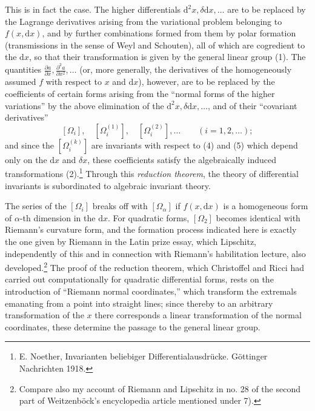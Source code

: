 \documentclass[11pt]{article}
\providecommand{\dd}{\mathrm d}
\begin{document}
This is in fact the case. The higher differentials $\dd^2x,\delta\dd x,\ldots$ are to be replaced by the Lagrange derivatives arising from the variational problem belonging to $f(x,\dd x)$, and by further combinations formed from them by polar formation (transmissions in the sense of Weyl and Schouten), all of which are cogredient to the $\dd x$, so that their transformation is given by the general linear group (1). The quantities $\frac{\partial a}{\partial x},\frac{\partial^2a}{\partial x^2},\ldots$ (or, more generally, the derivatives of the homogeneously assumed $f$ with respect to $x$ and $\dd x$), however, are to be replaced by the coefficients of certain forms arising from the ``normal forms of the higher variations'' by the above elimination of the $\dd^2x,\delta\dd x,\ldots$, and of their ``covariant derivatives''
\[
 [\Omega_i],\quad [\Omega_i^{(1)}],\quad [\Omega_i^{(2)}],\ldots\qquad (i=1,2,\ldots);
\]
and since the $[\Omega_i^{(k)}]$ are invariants with respect to (4) and (5) which depend only on the $\dd x$ and $\delta x$, these coefficients satisfy the algebraically induced transformations (2).\footnote{E. Noether, Invarianten beliebiger Differentialausdrücke. Göttinger Nachrichten 1918.} Through this \emph{reduction theorem}, the theory of differential invariants is subordinated to algebraic invariant theory.

The series of the $[\Omega_i]$ breaks off with $[\Omega_\alpha]$ if $f(x,\dd x)$ is a homogeneous form of $\alpha$-th dimension in the $\dd x$. For quadratic forms, $[\Omega_2]$ becomes identical with Riemann's curvature form, and the formation process indicated here is exactly the one given by Riemann in the Latin prize essay, which Lipschitz, independently of this and in connection with Riemann's habilitation lecture, also developed.\footnote{Compare also my account of Riemann and Lipschitz in no. 28 of the second part of Weitzenböck's encyclopedia article mentioned under 7).} The proof of the reduction theorem, which Christoffel and Ricci had carried out computationally for quadratic differential forms, rests on the introduction of ``Riemann normal coordinates,'' which transform the extremals emanating from a point into straight lines; since thereby to an arbitrary transformation of the $x$ there corresponds a linear transformation of the normal coordinates, these determine the passage to the general linear group.
\end{document}
